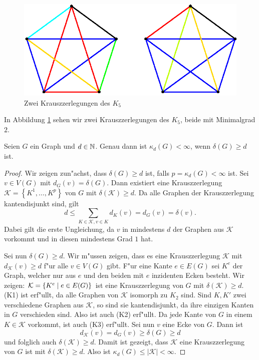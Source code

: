 \begin{figure}[htb]
  \centering
  \includegraphics{images/K5krauszdecomp.eps}
  \caption{Zwei Krauszzerlegungen des $K_5$}
  \label{fig:KrauszzerlegungK5}
\end{figure}

In Abbildung \ref{fig:KrauszzerlegungK5} sehen wir zwei Krauszzerlegungen des $K_5$, beide mit Minimalgrad $2$. 

\begin{lemma}
  Seien $G$ ein Graph und $d\in {\mathbb{N}}$. Genau dann ist $\kappa_{d}(G) < \infty$, wenn $\delta(G) \geq d$ ist. 
  \label{lm:krauszexistenz}
\end{lemma}

\begin{proof}
  Wir zeigen zun"achst, dass $\delta(G) \geq d$ ist, falls $p = \kappa_d(G) < \infty$ ist. Sei $v\in V(G)$ mit $d_{G}(v) = \delta(G)$. Dann existiert eine Krauszzerlegung $\mathcal{K}=\left\{ K^{1}, \dots , K^{p} \right\}$ von $G$ mit $\delta(\mathcal{K}) \geq d$. Da alle Graphen der Krauszzerlegung kantendisjunkt sind, gilt 
  $$ d \leq \sum\limits_{K\in \mathcal{K}, v\in K} d_{K}(v) = d_{G}(v) = \delta(v).$$
  Dabei gilt die erste Ungleichung, da $v$ in mindestens $d$ der Graphen aus $\mathcal{K}$ vorkommt und in diesen mindestens Grad $1$ hat.

  Sei nun $\delta(G) \geq d$. Wir m"ussen zeigen, dass es eine Krauszzerlegung $\mathcal{K}$ mit
  $d_{\mathcal{K}}(v) \geq d$ f"ur alle $v\in V(G)$ gibt. 
  F"ur eine Kante $e\in E(G)$ sei $K^{e}$ der Graph, welcher nur aus $e$ und den beiden mit $e$ inzidenten Ecken besteht. Wir zeigen:  $\mathcal{K} = \{K^e \;|\; e\in E(G) \}$ ist eine Krauszzerlegung von $G$ mit $\delta(\mathcal{K}) \geq d$.
 (K1) ist erf"ullt, da alle Graphen von $\mathcal{K}$ isomorph zu $K_{2}$ sind. Sind $K,K'$ zwei verschiedene Graphen aus $\mathcal{K}$, so sind sie kantendisjunkt, da ihre einzigen Kanten in $G$ verschieden sind. 
 Also ist auch (K2) erf"ullt. Da jede Kante von $G$ in einem $K\in \mathcal{K}$ vorkommt, ist auch (K3) erf"ullt. Sei nun $v$ eine Ecke von $G$. Dann ist $$d_{\mathcal{K}}(v) = d_{G}(v) \geq \delta(G) \geq d$$ und folglich auch $\delta(\mathcal{K}) \geq d$. Damit ist gezeigt, dass $\mathcal{K}$ eine Krauszzerlegung von $G$ ist mit $\delta\left( \mathcal{K} \right) \geq d$. Also ist
  $\kappa_{d}(G) \leq |\mathcal{K}| <
  \infty$.
\end{proof}

